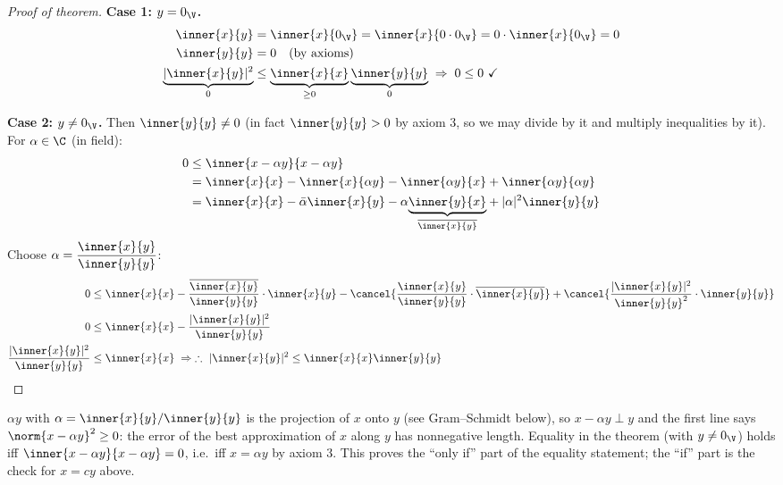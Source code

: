 \begin{proof}[Proof of theorem]
\textbf{Case 1: $y = 0_{\V}$.}
\begin{align*}
\inner{x}{y} &= \inner{x}{0_{\V}} = \inner{x}{0\cdot 0_{\V}} = 0\cdot\inner{x}{0_{\V}} = 0\\
\inner{y}{y} &= 0 \quad \text{(by axioms)}\\
\underbrace{|\inner{x}{y}|^2}_{0} &\le \underbrace{\inner{x}{x}}_{\ge 0}\underbrace{\inner{y}{y}}_{0} \;\Rightarrow\; 0\le 0 \ \checkmark
\end{align*}

\textbf{Case 2: $y\neq 0_{\V}$.} Then $\inner{y}{y}\neq 0$ (in fact $\inner{y}{y}>0$ by axiom 3, so we may divide by it and multiply inequalities by it).
For $\alpha\in\C$ (in field):
\begin{align*}
0 &\le \inner{x-\alpha y}{x-\alpha y}\\
&= \inner{x}{x} - \inner{x}{\alpha y} - \inner{\alpha y}{x} + \inner{\alpha y}{\alpha y}\\
&= \inner{x}{x} - \bar\alpha\inner{x}{y} - \alpha{\underbrace{\inner{y}{x}}_{\overline{\inner{x}{y}}}} + |\alpha|^2\inner{y}{y}
\end{align*}
Choose $\displaystyle \alpha = \frac{\inner{x}{y}}{\inner{y}{y}}$:
\begin{align*}
0 &\le \inner{x}{x} - \frac{\overline{\inner{x}{y}}}{\inner{y}{y}}\cdot\inner{x}{y} - \cancel{\frac{\inner{x}{y}}{\inner{y}{y}}\cdot\overline{\inner{x}{y}}} + \cancel{\frac{|\inner{x}{y}|^2}{\inner{y}{y}^2}\cdot\inner{y}{y}}\\
0 &\le \inner{x}{x} - \frac{|\inner{x}{y}|^2}{\inner{y}{y}}\\
\frac{|\inner{x}{y}|^2}{\inner{y}{y}} &\le \inner{x}{x} \;\Rightarrow\; \therefore\ |\inner{x}{y}|^2 \le \inner{x}{x}\inner{y}{y}
\qedhere
\end{align*}
\end{proof}
\begin{insight}
$\alpha y$ with $\alpha = \inner{x}{y}/\inner{y}{y}$ is the projection of $x$ onto $y$ (see Gram--Schmidt below), so $x-\alpha y\perp y$ and the first line says $\norm{x-\alpha y}^2\ge 0$: the error of the best approximation of $x$ along $y$ has nonnegative length.
Equality in the theorem (with $y\neq 0_\V$) holds iff $\inner{x-\alpha y}{x-\alpha y} = 0$, i.e.\ iff $x = \alpha y$ by axiom 3. This proves the ``only if'' part of the equality statement; the ``if'' part is the check for $x = cy$ above.
\end{insight}

